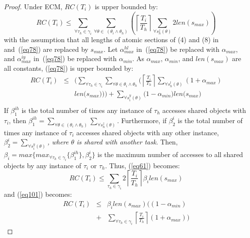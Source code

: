 \documentclass[a4paper,english]{article}
\newtheorem{proof}{Proof}
\begin{document}
\begin{proof}\normalfont
Under ECM, $RC(T_{i})$ is upper bounded by:
\begin{equation}
RC(T_{i})\le\sum_{\forall \tau_{h}\in\gamma_{i}}\sum_{\forall \theta\in\ (\theta_{i}\wedge\theta_{h})}\left(\left\lceil\frac{T_{i}}{T_{h}}\right\rceil\sum_{\forall s_{h}^{z}(\theta)}2len(s_{max})\right)\label{eq61}\end{equation}
with the assumption that all lengths of atomic sections of (4) and (8) in~\cite{stmconcurrencycontrol:emsoft11} and~(\ref{eq78}) are replaced by $s_{max}$.
Let $\alpha_{max}^{hl}$ in~(\ref{eq78}) be replaced with $\alpha_{max}$, and $\alpha_{max}^{iy}$ in~(\ref{eq78}) be replaced with $\alpha_{min}$. 
As $\alpha_{max}$, $\alpha_{min}$, and $len(s_{max})$ are all constants, (\ref{eq78}) is upper bounded by:
\begin{eqnarray}
RC(T_i) & \le & \Bigg(\sum_{\forall \tau_h \in \gamma_i}\sum_{\forall\theta \in \theta_i \wedge \theta_h}\Bigg(\left\lceil\frac{T_{i}}{T_{h}}\right\rceil\sum_{\forall s_{h}^{l}(\theta)}\left(1+\alpha_{max}\right)\nonumber\\
& & len\Big(s_{max}\Big)\Bigg)\Bigg)
 +  \sum_{\forall s_{i}^{y}(\theta)}\Big(1-\alpha_{min}\Big)len\Big(s_{max}\Big)\nonumber\\ 
\label{eq101}\end{eqnarray}
%
If $\beta_1^{ih}$ is the total number of times any instance of $\tau_h$ accesses shared objects with $\tau_i$, then $\beta_1^{ih}=\sum_{\forall \theta\in(\theta_{i}\wedge\theta_{h})}\sum_{\forall s_{h}^{z}(\theta)}$. Furthermore, if $\beta_2^i$ is the total number of times any instance of $\tau_i$ accesses shared objects with any other instance,   $\beta_2^i=\sum_{\forall s_{i}^{y}(\theta)}$\textit{, where $\theta$ is shared with another task}. Then, $\beta_{i}=max\{max_{\forall \tau_h \in \gamma_i}\{\beta_1^{ih}\},\beta_2^i\}$ is the maximum number of accesses to all shared objects by any instance of $\tau_{i}$ or $\tau_{h}$. 
Thus, (\ref{eq61}) becomes:
\begin{equation}
RC(T_{i})\le\sum_{\tau_{h}\in\gamma_{i}}2\left\lceil\frac{T_{i}}{T_{h}}\right\rceil\beta_{i}len(s_{max})
\label{eq63}\end{equation}
and (\ref{eq101}) becomes:
\begin{eqnarray}
RC(T_{i}) & \le & \beta_{i}len(s_{max}) \Bigg((1-\alpha_{min})\nonumber\\
& + & \sum_{\forall \tau_h \in \gamma_i}\left\lceil\frac{T_{i}}{T_{h}}\right\rceil(1+\alpha_{max})\Bigg)
\label{eq102}\end{eqnarray}


\end{proof}
\end{document}
